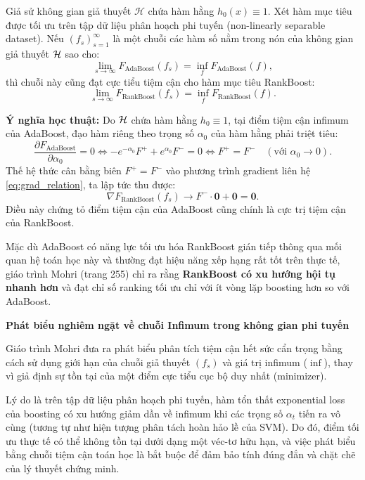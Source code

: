 \begin{tcolorbox}[enhanced, breakable, colback=blue!5, colframe=blue!50!black, title={\textbf{Mối liên hệ học thuật AdaBoost $\leftrightarrow$ RankBoost}}]
Giả sử không gian giả thuyết $\mathcal{H}$ chứa hàm hằng $h_0(x) \equiv 1$. Xét hàm mục tiêu được tối ưu trên tập dữ liệu phân hoạch phi tuyến (non-linearly separable dataset). 
Nếu $(f_s)_{s=1}^\infty$ là một chuỗi các hàm số nằm trong nón của không gian giả thuyết $\mathcal{H}$ sao cho:
\begin{equation}
    \lim_{s \to \infty} F_{\text{AdaBoost}}(f_s) = \inf_{f} F_{\text{AdaBoost}}(f),
\end{equation}
thì chuỗi này cũng đạt cực tiểu tiệm cận cho hàm mục tiêu RankBoost:
\begin{equation}
    \lim_{s \to \infty} F_{\text{RankBoost}}(f_s) = \inf_{f} F_{\text{RankBoost}}(f).
\end{equation}

\textbf{Ý nghĩa học thuật:}
Do $\mathcal{H}$ chứa hàm hằng $h_0 \equiv 1$, tại điểm tiệm cận infimum của AdaBoost, đạo hàm riêng theo trọng số $\alpha_0$ của hàm hằng phải triệt tiêu:
\[
    \frac{\partial F_{\text{AdaBoost}}}{\partial \alpha_0} = 0 \iff -e^{-\alpha_0} F^+ + e^{\alpha_0} F^- = 0 \iff F^+ = F^- \quad (\text{với } \alpha_0 \to 0).
\]
Thế hệ thức cân bằng biên $F^+ = F^-$ vào phương trình gradient liên hệ \eqref{eq:grad_relation}, ta lập tức thu được:
\[
    \nabla F_{\text{RankBoost}}(f_s) \to F^- \cdot \bm{0} + \bm{0} = \bm{0}.
\]
Điều này chứng tỏ điểm tiệm cận của AdaBoost cũng chính là cực trị tiệm cận của RankBoost.

Mặc dù AdaBoost có năng lực tối ưu hóa RankBoost gián tiếp thông qua mối quan hệ toán học này và thường đạt hiệu năng xếp hạng rất tốt trên thực tế, giáo trình Mohri (trang 255) chỉ ra rằng \textbf{RankBoost có xu hướng hội tụ nhanh hơn} và đạt chỉ số ranking tối ưu chỉ với ít vòng lặp boosting hơn so với AdaBoost.
\end{tcolorbox}

\begin{morong}
\textbf{Phát biểu nghiêm ngặt về chuỗi Infimum trong không gian phi tuyến}

Giáo trình Mohri đưa ra phát biểu phân tích tiệm cận hết sức cẩn trọng bằng cách sử dụng giới hạn của chuỗi giả thuyết $(f_s)$ và giá trị infimum ($\inf$), thay vì giả định sự tồn tại của một điểm cực tiểu cục bộ duy nhất (minimizer). 

Lý do là trên tập dữ liệu phân hoạch phi tuyến, hàm tổn thất exponential loss của boosting có xu hướng giảm dần về infimum khi các trọng số $\alpha_t$ tiến ra vô cùng (tương tự như hiện tượng phân tách hoàn hảo lề của SVM). Do đó, điểm tối ưu thực tế có thể không tồn tại dưới dạng một véc-tơ hữu hạn, và việc phát biểu bằng chuỗi tiệm cận toán học là bắt buộc để đảm bảo tính đúng đắn và chặt chẽ của lý thuyết chứng minh.
\end{morong}

